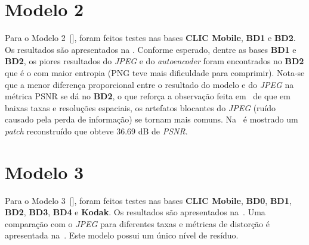 \section{Modelo 2}
\label{res:mod2}
Para o Modelo 2~[], foram feitos testes nas bases \textbf{\acrshort{CLIC} Mobile}, \textbf{BD1} e \textbf{BD2}. Os resultados são apresentados na . Conforme esperado, dentre as bases \textbf{BD1} e \textbf{BD2}, os piores resultados do \textit{JPEG} e do \textit{autoencoder} foram encontrados no \textbf{BD2} que é o com maior entropia (\acrshort{PNG} teve mais dificuldade para comprimir). Nota-se que a menor diferença proporcional entre o resultado do modelo e do \textit{JPEG} na métrica \acrshort{PSNR} se dá no \textbf{BD2}, o que reforça a observação feita em~\cite{Variable2016Toderici} de que em baixas taxas e resoluções espaciais, os artefatos blocantes do \textit{JPEG} (ruído causado pela perda de informação) se tornam mais comuns. Na~ é mostrado um \textit{patch} reconstruído que obteve 36.69 \acrshort{dB} de \textit{PSNR}.
\section{Modelo 3}
\label{res:mod3}
Para o Modelo 3~[], foram feitos testes nas bases \textbf{\acrshort{CLIC} Mobile}, \textbf{BD0}, \textbf{BD1}, \textbf{BD2}, \textbf{BD3}, \textbf{BD4} e \textbf{Kodak}. Os resultados são apresentados na~. Uma comparação com o \textit{JPEG} para diferentes taxas e métricas de distorção é apresentada na~. Este modelo possui um único nível de resíduo.

